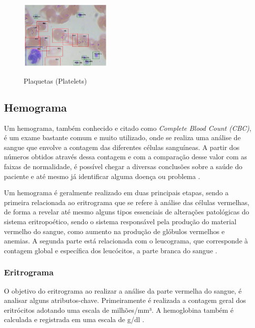 \begin{figure}[!htb]
	\centering
	\caption{Plaquetas (Platelets)}
	\includegraphics[width=0.40\textwidth]{img/plt.jpg}
	\label{fig:plaquetas}
\end{figure}

\subsection{Hemograma}
Um hemograma, também conhecido e citado como \emph{Complete Blood Count (CBC)}, é um exame bastante comum e muito utilizado, onde se realiza uma análise de sangue que envolve a contagem das diferentes células sanguíneas. A partir dos números obtidos através dessa contagem e com a comparação desse valor com as faixas de normalidade, é possível chegar a diversas conclusões sobre a saúde do paciente e até mesmo já identificar alguma doença ou problema \cite{manualHematologia, abcOfCbc}.

Um hemograma é geralmente realizado em duas principais etapas, sendo a primeira relacionada ao eritrograma que se refere à análise das células vermelhas, de forma a revelar até mesmo alguns tipos essenciais de alterações patológicas do sistema eritropoético, sendo o sistema responsável pela produção do material vermelho do sangue, como aumento na produção de glóbulos vermelhos e anemias. A segunda parte está relacionada com o leucograma, que corresponde à contagem global e específica dos leucócitos, a parte branca do sangue \cite{manualHematologia, abcOfCbc}.

\subsubsection{Eritrograma}
O objetivo do eritrograma ao realizar a análise da parte vermelha do sangue, é analisar alguns atributos-chave. Primeiramente é realizada a contagem geral dos eritrócitos adotando uma escala de milhões/mm³. A hemoglobina também é calculada e registrada em uma escala de g/dl \cite{interpretacaoHemograma, manualHematologia}.

